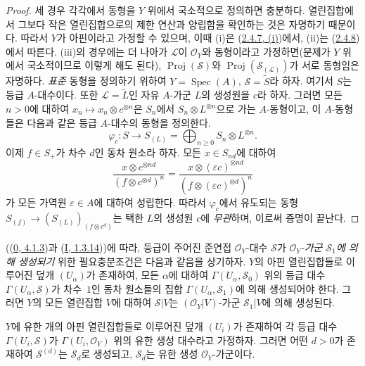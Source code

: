 \begin{proof}
세 경우 각각에서 동형을 $Y$ 위에서 국소적으로 정의하면 충분하다.
열린집합에서 그보다 작은 열린집합으로의 제한 연산과 양립함을 확인하는
것은 자명하기 때문이다. 따라서 $Y$가 아핀이라고 가정할 수 있으며,
이때 (i)은 (\hyperref[II.2.4.7-ko]{2.4.7, (i)})에서, (ii)는
(\hyperref[II.2.4.8-ko]{2.4.8})에서 따른다. (iii)의 경우에는 더 나아가
$\mathcal{L}$이 $\mathcal{O}_Y$와 동형이라고 가정하면(문제가 $Y$ 위에서
국소적이므로 이렇게 해도 된다), $\operatorname{Proj}(\mathcal{S})$와
$\operatorname{Proj}(\mathcal{S}_{(\mathcal{L})})$가 서로 동형임은
자명하다. \emph{표준} 동형을 정의하기 위하여
$Y=\operatorname{Spec}(A)$, $\mathcal{S}=\widetilde{S}$라 하자. 여기서
$S$는 등급 $A$-대수이다. 또한 $\mathcal{L}=\widetilde{L}$인 자유
$A$-가군 $L$의 생성원을 $c$라 하자. 그러면 모든 $n>0$에 대하여
$x_n\mapsto x_n\otimes c^{\otimes n}$은 $S_n$에서
$S_n\otimes L^{\otimes n}$으로 가는 $A$-동형이고, 이 $A$-동형들은
다음과 같은 등급 $A$-대수의 동형을 정의한다.
\[
  \varphi_c:S\longrightarrow S_{(L)}
  =\bigoplus_{n\geq0}S_n\otimes L^{\otimes n}.
\]
이제 $f\in S_+$가 차수 $d$인 동차 원소라 하자. 모든 $x\in S_{nd}$에
대하여
\[
  \frac{x\otimes c^{\otimes nd}}{(f\otimes c^{\otimes d})^n}
  =\frac{x\otimes(\varepsilon c)^{\otimes nd}}
  {(f\otimes(\varepsilon c)^{\otimes d})^n}
\]
가 모든 가역원 $\varepsilon\in A$에 대하여 성립한다. 따라서
$\varphi_c$에서 유도되는 동형
$S_{(f)}\to(S_{(L)})_{(f\otimes c^d)}$는 택한 $L$의 생성원 $c$에
\emph{무관}하며, 이로써 증명이 끝난다.
\end{proof}

\begin{env}[3.1.9]
\label{II.3.1.9-ko}
((\hyperref[0.4.1.3-ko]{0, 4.1.3})과
(\hyperref[I.1.3.14-ko]{I, 1.3.14}))에 따라, 등급이 주어진 준연접
$\mathcal{O}_Y$-대수 $\mathcal{S}$가
\emph{$\mathcal{O}_Y$-가군 $\mathcal{S}_1$에 의해 생성되기} 위한
필요충분조건은 다음과 같음을 상기하자. $Y$의 아핀 열린집합들로 이루어진
덮개 $(U_\alpha)$가 존재하여, 모든 $\alpha$에 대하여
$\Gamma(U_\alpha,\mathcal{S}_0)$ 위의 등급 대수
$\Gamma(U_\alpha,\mathcal{S})$가 차수~$1$인 동차 원소들의 집합
$\Gamma(U_\alpha,\mathcal{S}_1)$에 의해 생성되어야 한다. 그러면 $Y$의
모든 열린집합 $V$에 대하여 $\mathcal{S}|V$는
$(\mathcal{O}_Y|V)$-가군 $\mathcal{S}_1|V$에 의해 생성된다.
\end{env}

\begin{proposition}[3.1.10]
\label{II.3.1.10-ko}
$Y$에 유한 개의 아핀 열린집합들로 이루어진 덮개 $(U_i)$가 존재하여
각 등급 대수 $\Gamma(U_i,\mathcal{S})$가
$\Gamma(U_i,\mathcal{O}_Y)$ 위의 유한 생성 대수라고 가정하자. 그러면
어떤 $d>0$가 존재하여 $\mathcal{S}^{(d)}$는 $\mathcal{S}_d$로 생성되고,
$\mathcal{S}_d$는 유한 생성 $\mathcal{O}_Y$-가군이다.
\end{proposition}

